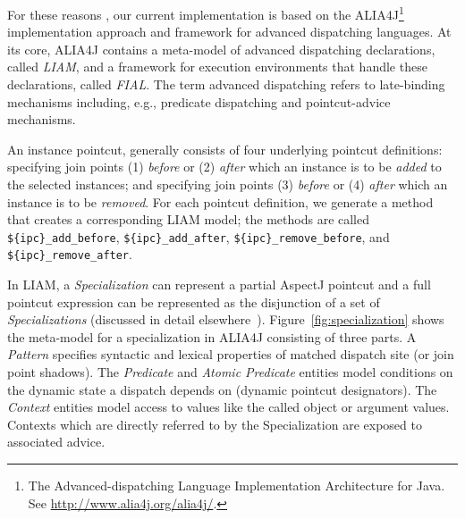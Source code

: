 \documentclass{acm_proc_article-sp}
\begin{document}
For these reasons , our current implementation is based on the ALIA4J\footnote{The Advanced-dispatching Language Implementation Architecture for Java. See \url{http://www.alia4j.org/alia4j/}.}~\cite{Bockisch2012,Bockisch2011} implementation approach and framework for advanced dispatching languages.
At its core, ALIA4J contains a meta-model of advanced dispatching declarations, called \emph{LIAM}, and a framework for execution environments that handle these declarations, called \emph{FIAL}.
The term advanced dispatching refers to late-binding mechanisms including, e.g., predicate dispatching and pointcut-advice mechanisms.

An instance pointcut, generally consists of four underlying pointcut definitions: specifying join points (1) \emph{before} or (2) \emph{after} which an instance is to be \emph{added} to the selected instances; and specifying join points (3) \emph{before} or (4) \emph{after} which an instance is to be \emph{removed}.
For each pointcut definition, we generate a method that creates a corresponding LIAM model; the methods are called \lstinline!${ipc}_add_before!, \lstinline!${ipc}_add_after!, \lstinline!${ipc}_remove_before!, and \lstinline!${ipc}_remove_after!.

In LIAM, a \emph{Specialization} can represent a partial AspectJ pointcut and a full pointcut expression can be represented as the disjunction of a set of \emph{Specializations} (discussed in detail elsewhere~\cite{Bockisch2007}). 
Figure~\ref{fig:specialization} shows the meta-model for a specialization in ALIA4J consisting of three parts.
A \emph{Pattern} specifies syntactic and lexical properties of matched dispatch site (or join point shadows).
The \emph{Predicate} and \emph{Atomic Predicate} entities model conditions on the dynamic state a dispatch depends on (dynamic pointcut designators).
The \emph{Context} entities model access to values like the called object or argument values.
Contexts which are directly referred to by the Specialization are exposed to associated advice.
\end{document}

